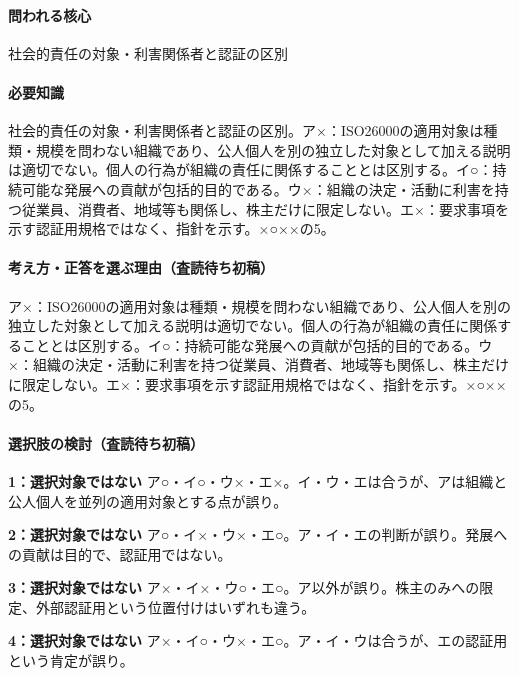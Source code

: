 \paragraph{問われる核心} 社会的責任の対象・利害関係者と認証の区別

\paragraph{必要知識} 社会的責任の対象・利害関係者と認証の区別。ア×：ISO26000の適用対象は種類・規模を問わない組織であり、公人個人を別の独立した対象として加える説明は適切でない。個人の行為が組織の責任に関係することとは区別する。イ○：持続可能な発展への貢献が包括的目的である。ウ×：組織の決定・活動に利害を持つ従業員、消費者、地域等も関係し、株主だけに限定しない。エ×：要求事項を示す認証用規格ではなく、指針を示す。×○××の5。

\paragraph{考え方・正答を選ぶ理由（査読待ち初稿）} ア×：ISO26000の適用対象は種類・規模を問わない組織であり、公人個人を別の独立した対象として加える説明は適切でない。個人の行為が組織の責任に関係することとは区別する。イ○：持続可能な発展への貢献が包括的目的である。ウ×：組織の決定・活動に利害を持つ従業員、消費者、地域等も関係し、株主だけに限定しない。エ×：要求事項を示す認証用規格ではなく、指針を示す。×○××の5。

\paragraph{選択肢の検討（査読待ち初稿）}\mbox{}\par

\noindent\textbf{1：選択対象ではない} ア○・イ○・ウ×・エ×。イ・ウ・エは合うが、アは組織と公人個人を並列の適用対象とする点が誤り。\par

\noindent\textbf{2：選択対象ではない} ア○・イ×・ウ×・エ○。ア・イ・エの判断が誤り。発展への貢献は目的で、認証用ではない。\par

\noindent\textbf{3：選択対象ではない} ア×・イ×・ウ○・エ○。ア以外が誤り。株主のみへの限定、外部認証用という位置付けはいずれも違う。\par

\noindent\textbf{4：選択対象ではない} ア×・イ○・ウ×・エ○。ア・イ・ウは合うが、エの認証用という肯定が誤り。\par

